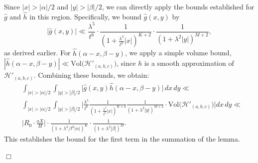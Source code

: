 \documentclass{article}
\def\H{{\mathcal H}}
\def\H{{\mathcal H}}
\newenvironment{proof}{\noindent {\bf Proof:}}{$\Box$ \vspace{2 ex}}
\begin{document}
\begin{proof}
Since $|x| > |\alpha|/2$ and $|y| > |\beta|/2$, we can directly apply the bounds established for $\widehat{g}$ and $\widehat{h}$ in this region. Specifically, we bound $\widehat{g}(x, y)$ by
\begin{equation*}
\big|\widehat{g}(x, y) \big| \ll \frac{\lambda^5}{t^6} \cdot \frac{1}{\left(1 + \frac{\lambda^3}{t^6} |x|\right)^{K+2}} \cdot \frac{1}{(1 + \lambda^2 |y|)^{M+2}},
\end{equation*}
as derived earlier. For $\widehat{h}(\alpha - x, \beta - y)$, we apply a simple volume bound, $|\widehat{h}(\alpha - x, \beta - y)|\ll \text{Vol}\big(\H'_{(a,b,c)}\big)$, since $h$ is a smooth approximation of $\mathcal{H}'_{(a, b, c)}$. Combining these bounds, we obtain:
\begin{align*}
&\int_{|x| > |\alpha|/2} \int_{|y| > |\beta|/2} \big|\widehat{g}(x, y) \widehat{h}(\alpha - x, \beta - y)\big| \, dx \, dy \ll \\
& \int_{|x| > |\alpha|/2} \int_{|y| > |\beta|/2} \Big| \frac{\lambda^5}{t^6} \frac{1}{\left(1 + \frac{\lambda^3}{t^6} |x|\right)^{K+2}} \frac{1}{(1 + \lambda^2 |y|)^{M+2}} \cdot \text{Vol}\big(\H'_{(a,b,c)}\big) \Big| dx \, dy  \ll \\ 
&\big|R_0\cdot\frac{aX}{H}\big| \cdot \frac{1}{(1+\lambda^{3}/t^6|\alpha|)^K} \cdot \frac{1}{(1+\lambda^2|\beta|)^M}.
\end{align*}
This establishes the bound for the first term in the summation of the lemma.



\end{proof}
\end{document}
